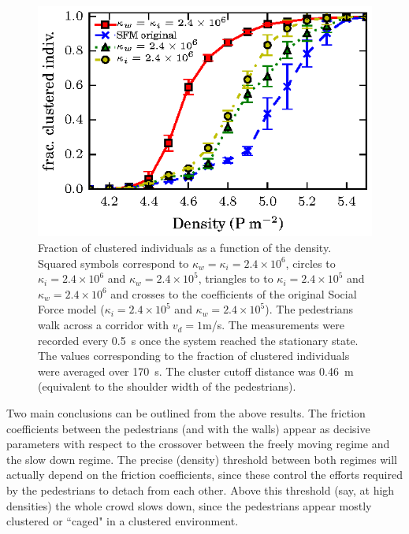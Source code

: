 \begin{figure}[htbp!]
\includegraphics[width=\columnwidth]
{plots/fracc_clusteriz_vs_density.eps}
\caption{\label{fic} Fraction of clustered individuals as a function of the density. Squared symbols correspond to $\kappa_w=\kappa_i=2.4\times 10^6$, circles to $\kappa_i=2.4\times 10^6$ and $\kappa_w=2.4\times 10^5$, triangles to to $\kappa_i=2.4\times 10^5$ and $\kappa_w=2.4\times 10^6$ and crosses to the coefficients of the original Social Force model ($\kappa_i=2.4\times 10^5$ and $\kappa_w=2.4\times 10^5$). The pedestrians walk across a corridor with $v_d=1$m/s. The measurements were recorded every 0.5~s once the system reached the stationary state. The values corresponding to the fraction of clustered individuals were averaged over 170~s. The cluster cutoff distance was 0.46~m (equivalent to the shoulder width of the pedestrians).}
\end{figure}

{\color{red} Two main conclusions can be outlined from the above
results. The friction coefficients between the pedestrians
(and with the walls) appear as decisive parameters
with respect to the crossover between the freely moving
regime and the slow down regime. The precise (density) threshold between both regimes will actually depend on
the friction coefficients, since these control the efforts
required by the pedestrians to detach from each other.
Above this threshold (say, at high densities) the whole
crowd slows down, since the pedestrians appear mostly
clustered or ``caged" in a clustered environment.}\\

